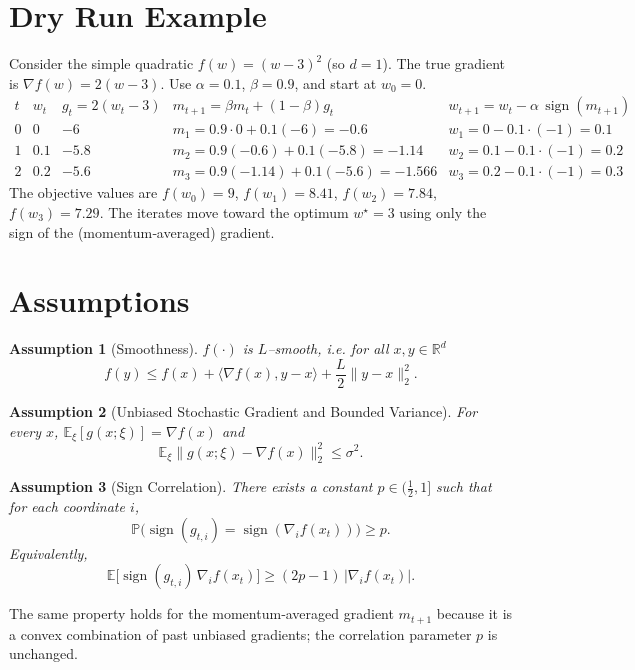 \documentclass{article}
\newtheorem{assumption}{Assumption}
\begin{document}
\section*{Dry Run Example}
Consider the simple quadratic $f(w)=(w-3)^2$ (so $d=1$).  
The true gradient is $\nabla f(w)=2(w-3)$.  Use $\alpha=0.1$, $\beta=0.9$, and start at $w_0=0$.
\[
\begin{array}{c|c|c|c|c}
t & w_t & g_t=2(w_t-3) & m_{t+1}= \beta m_t+(1-\beta)g_t & w_{t+1}=w_t-\alpha\,\operatorname{sign}(m_{t+1})\\ \hline
0 & 0   & -6   & m_1=0.9\cdot0+0.1(-6)=-0.6 & w_1=0-0.1\cdot(-1)=0.1\\
1 & 0.1 & -5.8 & m_2=0.9(-0.6)+0.1(-5.8)=-1.14 & w_2=0.1-0.1\cdot(-1)=0.2\\
2 & 0.2 & -5.6 & m_3=0.9(-1.14)+0.1(-5.6)=-1.566 & w_3=0.2-0.1\cdot(-1)=0.3
\end{array}
\]
The objective values are $f(w_0)=9$, $f(w_1)=8.41$, $f(w_2)=7.84$, $f(w_3)=7.29$.  The iterates move toward the optimum $w^\star=3$ using only the sign of the (momentum‑averaged) gradient.

\newpage
\section*{Assumptions}
\begin{assumption}[Smoothness]\label{as:smooth}
$f(\cdot)$ is $L$–smooth, i.e. for all $x,y\in\mathbb{R}^d$
\[
f(y)\le f(x)+\langle\nabla f(x),y-x\rangle+\frac{L}{2}\|y-x\|_2^{2}. 
\]
\end{assumption}
\begin{assumption}[Unbiased Stochastic Gradient and Bounded Variance]\label{as:unbiased}
For every $x$, $\mathbb{E}_{\xi}[g(x;\xi)]=\nabla f(x)$ and
\[
\mathbb{E}_{\xi}\bigl\|g(x;\xi)-\nabla f(x)\bigr\|_2^{2}\le\sigma^{2}.
\]
\end{assumption}
\begin{assumption}[Sign Correlation]\label{as:signcorr}
There exists a constant $p\in\bigl(\tfrac12,1\bigr]$ such that for each coordinate $i$,
\[
\mathbb{P}\bigl(\operatorname{sign}(g_{t,i})=\operatorname{sign}(\nabla_i f(x_t))\bigr)\ge p .
\]
Equivalently,
\[
\mathbb{E}\bigl[\operatorname{sign}(g_{t,i})\,\nabla_i f(x_t)\bigr]\ge (2p-1)\,|\nabla_i f(x_t)|.
\]
\end{assumption}
The same property holds for the momentum‑averaged gradient $m_{t+1}$ because it is a convex combination of past unbiased gradients; the correlation parameter $p$ is unchanged.
\end{document}
